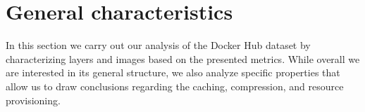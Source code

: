 \section{General characteristics}
\label{sec:char}

In this section we carry out our analysis of the Docker Hub dataset by
characterizing layers and images based on the presented metrics.
%
While overall we are interested in its general structure, we also analyze
specific properties that allow us to draw conclusions regarding the caching,
compression, and resource provisioning.




